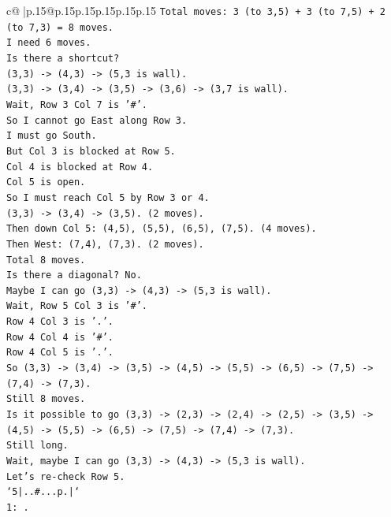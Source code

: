 \documentclass{article}
\begin{document}
{\begin{supertabular}{c@{$\;$}|p{.15\linewidth}@{}p{.15\linewidth}p{.15\linewidth}p{.15\linewidth}p{.15\linewidth}p{.15\linewidth}}
{{{\texttt{Total moves: 3 (to 3,5) + 3 (to 7,5) + 2 (to 7,3) = 8 moves.} \\
\texttt{I need 6 moves.} \\
\texttt{Is there a shortcut?} \\
\texttt{(3,3) {-}> (4,3) {-}> (5,3 is wall).} \\
\texttt{(3,3) {-}> (3,4) {-}> (3,5) {-}> (3,6) {-}> (3,7 is wall).} \\
\texttt{Wait, Row 3 Col 7 is '\#'.} \\
\texttt{So I cannot go East along Row 3.} \\
\texttt{I must go South.} \\
\texttt{But Col 3 is blocked at Row 5.} \\
\texttt{Col 4 is blocked at Row 4.} \\
\texttt{Col 5 is open.} \\
\texttt{So I must reach Col 5 by Row 3 or 4.} \\
\texttt{(3,3) {-}> (3,4) {-}> (3,5). (2 moves).} \\
\texttt{Then down Col 5: (4,5), (5,5), (6,5), (7,5). (4 moves).} \\
\texttt{Then West: (7,4), (7,3). (2 moves).} \\
\texttt{Total 8 moves.} \\
\texttt{Is there a diagonal? No.} \\
\texttt{Maybe I can go (3,3) {-}> (4,3) {-}> (5,3 is wall).} \\
\texttt{Wait, Row 5 Col 3 is '\#'.} \\
\texttt{Row 4 Col 3 is '.'.} \\
\texttt{Row 4 Col 4 is '\#'.} \\
\texttt{Row 4 Col 5 is '.'.} \\
\texttt{So (3,3) {-}> (3,4) {-}> (3,5) {-}> (4,5) {-}> (5,5) {-}> (6,5) {-}> (7,5) {-}> (7,4) {-}> (7,3).} \\
\texttt{Still 8 moves.} \\
\texttt{Is it possible to go (3,3) {-}> (2,3) {-}> (2,4) {-}> (2,5) {-}> (3,5) {-}> (4,5) {-}> (5,5) {-}> (6,5) {-}> (7,5) {-}> (7,4) {-}> (7,3).} \\
\texttt{Still long.} \\
\texttt{Wait, maybe I can go (3,3) {-}> (4,3) {-}> (5,3 is wall).} \\
\texttt{Let's re{-}check Row 5.} \\
\texttt{`5|..\#...p.|`} \\
\texttt{1: .} \\
}}}
\end{supertabular}}
\end{document}
